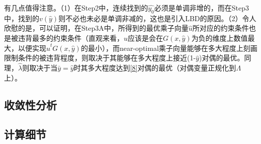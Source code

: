 \documentclass[UTF8,a4]{article}
\begin{document}
有几点值得注意。（1）在Step2中，连续找到的$\hat{y_0}$必须是单调非增的，而在Step3中，找到的$v(\hat{y})$则不必也未必是单调非减的，这也是引入LBD的原因。（2）令人欣慰的是，可以证明，在Step3A中，所得到的最优乘子向量$\hat{u}$所对应的约束条件也是被违背最多的约束条件（直观来看，$\hat{u}$应该是会在$G(x,\hat{y})$为负的维度上数值最大，以便实现$\hat{u}^tG(x,\hat{y})$的最小），而near-optimal乘子向量能够在多大程度上刻画限制条件的被违背程度，则取决于其能够在多大程度上接近(1-$\hat{y}$)对偶的最优。同理，$\hat{\lambda}$则取决于当$\bar{y}=\hat{y}$时其多大程度达到\eqref{8}对偶的最优（对偶变量正规化到$\Lambda$上）。

\subsection{收敛性分析}

\subsection{计算细节}
\end{document}
